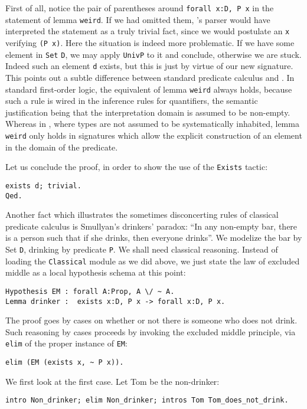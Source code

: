 \documentclass{book}
\begin{document}
First of all, notice the pair of parentheses around
\verb+forall x:D, P x+ in
the statement of lemma \verb:weird:.
If we had omitted them, \Coq's parser would have interpreted the
statement as a truly trivial fact, since we would 
postulate an \verb:x: verifying \verb:(P x):. Here the situation is indeed
more problematic. If we have some element in \verb:Set: \verb:D:, we may
apply \verb:UnivP: to it and conclude, otherwise we are stuck. Indeed
such an element \verb:d: exists, but this is just by virtue of our
new signature. This points out a subtle difference between standard
predicate calculus and \Coq. In standard first-order logic,
the equivalent of lemma \verb:weird: always holds, 
because such a rule is wired in the inference rules for quantifiers, the
semantic justification being that the interpretation domain is assumed to
be non-empty. Whereas in \Coq, where types are not assumed to be 
systematically inhabited, lemma \verb:weird: only holds in signatures
which allow the explicit construction of an element in the domain of
the predicate. 

Let us conclude the proof, in order to show the use of the \verb:Exists:
tactic:
\begin{lstlisting}
exists d; trivial.
Qed.
\end{lstlisting}

Another fact which illustrates the sometimes disconcerting rules of
classical 
predicate calculus is Smullyan's drinkers' paradox: ``In any non-empty
bar, there is a person such that if she drinks, then everyone drinks''.
We modelize the bar by Set \verb:D:, drinking by predicate \verb:P:.
We shall need classical reasoning. Instead of loading the \verb:Classical:
module as we did above, we just state the law of excluded middle as a
local hypothesis schema at this point:
\begin{lstlisting}
Hypothesis EM : forall A:Prop, A \/ ~ A.
Lemma drinker :  exists x:D, P x -> forall x:D, P x.
\end{lstlisting}
The proof goes by cases on whether or not
there is someone who does not drink. Such reasoning by cases proceeds
by invoking the excluded middle principle, via \verb:elim: of the
proper instance of \verb:EM::
\begin{lstlisting}
elim (EM (exists x, ~ P x)).
\end{lstlisting}

We first look at the first case. Let Tom be the non-drinker:
\begin{lstlisting}
intro Non_drinker; elim Non_drinker; intros Tom Tom_does_not_drink.
\end{lstlisting}
\end{document}

